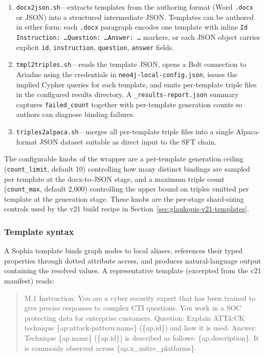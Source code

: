 \documentclass[unnumsec,webpdf,contemporary,large]{oup-authoring-template}
\theoremstyle{thmstyleone}
\theoremstyle{thmstyletwo}
\theoremstyle{thmstylethree}
\begin{document}
\begin{enumerate}
  \item \texttt{docx2json.sh}---extracts templates from the authoring format (Word \texttt{.docx} or JSON) into a structured intermediate JSON. Templates can be authored in either form: each \texttt{.docx} paragraph encodes one template with inline \texttt{Id Instruction: \ldots Question: \ldots Answer: \ldots} markers, or each JSON object carries explicit \texttt{id}, \texttt{instruction}, \texttt{question}, \texttt{answer} fields.
  \item \texttt{tmpl2triples.sh}---reads the template JSON, opens a Bolt connection to Ariadne using the credentials in \texttt{neo4j-local-config.json}, issues the implied Cypher queries for each template, and emits per-template triple files in the configured results directory. A \texttt{\_results-report.json} summary captures \texttt{failed\_count} together with per-template generation counts so authors can diagnose binding failures.
  \item \texttt{triples2alpaca.sh}---merges all per-template triple files into a single Alpaca-format JSON dataset suitable as direct input to the SFT chain.
\end{enumerate}

The configurable knobs of the wrapper are a per-template generation ceiling (\texttt{count\_limit}, default 10) controlling how many distinct bindings are sampled per template at the docx-to-JSON stage, and a maximum triple count (\texttt{count\_max}, default 2{,}000) controlling the upper bound on triples emitted per template at the generation stage. These knobs are the per-stage shard-sizing controls used by the v21 build recipe in Section~\ref{sec:glaukopis-v21-templates}.

\subsubsection*{Template syntax}
A Sophia template binds graph nodes to local aliases, references their typed properties through dotted attribute access, and produces natural-language output containing the resolved values. A representative template (excerpted from the v21 manifest) reads:

\begin{quote}\small\ttfamily
M.1 Instruction: You are a cyber security expert that has been trained to give precise responses to complex CTI questions. You work in a SOC protecting data for enterprise customers. Question: Explain ATT\&CK technique \{ap:attack-pattern.name\} (\{ap.id\}) and how it is used. Answer: Technique \{ap.name\} (\{ap.id\}) is described as follows: \{ap.description\}. It is commonly observed across \{ap.x\_mitre\_platforms\}.
\end{quote}
\end{document}
